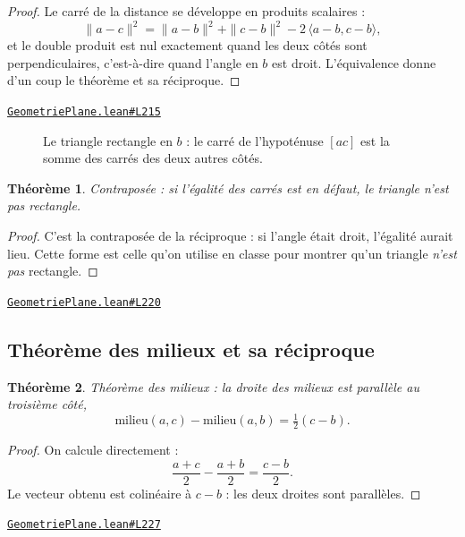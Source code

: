 \documentclass[11pt,a4paper]{article}
\theoremstyle{definition}
\theoremstyle{plain}
\newtheorem{theoreme}{Théorème}
\newcommand{\source}[2]{\par\smallskip\noindent\hfill{\footnotesize\href{#1}{\texttt{#2}}}\par\smallskip}
\begin{document}
\begin{proof}
Le carré de la distance se développe en produits scalaires :
\[ \|a - c\|^2 = \|a - b\|^2 + \|c - b\|^2 - 2\,\langle a - b, c - b\rangle , \]
et le double produit est nul exactement quand les deux côtés sont perpendiculaires,
c'est-à-dire quand l'angle en $b$ est droit. L'équivalence donne d'un coup le théorème et
sa réciproque.
\end{proof}
\source{https://github.com/Commutator-IO/learn-lean/blob/main/courses/01-college/02-geometrie-plane/GeometriePlane.lean\#L215}{GeometriePlane.lean\#L215}

\begin{figure}[h]
\centering

\caption{Le triangle rectangle en $b$ : le carré de l'hypoténuse $[ac]$ est la somme des carrés des deux autres côtés.}
\end{figure}

\begin{theoreme}
Contraposée : si l'égalité des carrés est en défaut, le triangle n'est pas rectangle.
\end{theoreme}

\begin{proof}
C'est la contraposée de la réciproque : si l'angle était droit, l'égalité aurait lieu.
Cette forme est celle qu'on utilise en classe pour montrer qu'un triangle \emph{n'est
pas} rectangle.
\end{proof}
\source{https://github.com/Commutator-IO/learn-lean/blob/main/courses/01-college/02-geometrie-plane/GeometriePlane.lean\#L220}{GeometriePlane.lean\#L220}

\subsection{Théorème des milieux et sa réciproque}

\begin{theoreme}
Théorème des milieux : la droite des milieux est parallèle au troisième côté,
\[ \text{milieu}(a,c) - \text{milieu}(a,b) = \tfrac{1}{2}(c - b) . \]
\end{theoreme}

\begin{proof}
On calcule directement :
\[ \frac{a+c}{2} - \frac{a+b}{2} = \frac{c - b}{2} . \]
Le vecteur obtenu est colinéaire à $c - b$ : les deux droites sont parallèles.
\end{proof}
\source{https://github.com/Commutator-IO/learn-lean/blob/main/courses/01-college/02-geometrie-plane/GeometriePlane.lean\#L227}{GeometriePlane.lean\#L227}
\end{document}
